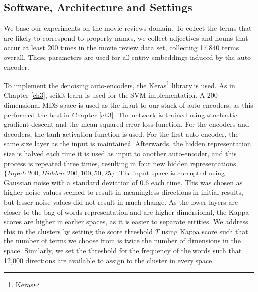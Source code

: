 
\subsection{Software, Architecture and Settings}\label{howto}

We base our experiments on the movie reviews domain. To collect the terms that are likely to correspond to property names, we collect adjectives and nouns that occur at least 200 times in the movie review data set, collecting 17,840 terms overall.  These parameters are used for all entity embeddings induced by the auto-encoder. 

To implement the denoising auto-encoders, the Keras\footnote{\href{https://keras.io/}{Keras}}  library is used. As in Chapter \ref{ch3}, scikit-learn is used for the SVM implementation.  A 200 dimensional MDS space is used as the input to our stack of auto-encoders, as this performed the best in Chapter \ref{ch3}. The network is trained using stochastic gradient descent and the mean squared error loss function. For the encoders and decoders, the tanh activation function is used. For the first auto-encoder,  the same size layer as the input is maintained. Afterwards, the hidden representation size is halved each time it is used  as input to another auto-encoder, and this process is repeated three times, resulting in four new hidden representations $\{Input: 200, Hidden: 200, 100, 50, 25\}$. The input space is corrupted using  Gaussian noise with a standard deviation of 0.6 each time. This was chosen as higher noise values seemed to result in meaningless directions in initial results, but lesser noise values did not result in much change. As the lower layers are closer to the bag-of-words representation and are higher dimensional, the Kappa scores are higher in earlier spaces, as it is easier to separate entities. We address this in the clusters by setting the  score threshold $T$ using Kappa score  such that the number of terms we choose from is twice the number of dimensions in the space. Similarly, we set the threshold for the frequency of the words such that 12,000 directions are available to assign to the cluster  in every space. 

